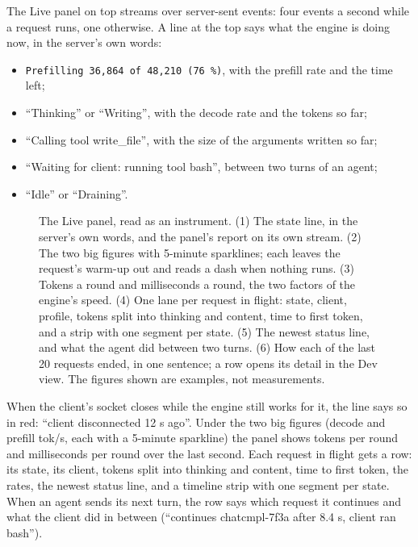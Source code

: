 The Live panel on top streams  over server-sent events: four events a second while a request runs, one otherwise. A line at the top says what the engine is doing now, in the server's own words:

\begin{itemize}
\item \texttt{Prefilling 36,864 of 48,210 (76\,\%)}, with the prefill rate and the time left;
\item \enquote{Thinking} or \enquote{Writing}, with the decode rate and the tokens so far;
\item \enquote{Calling tool write\_file}, with the size of the arguments written so far;
\item \enquote{Waiting for client: running tool bash}, between two turns of an agent;
\item \enquote{Idle} or \enquote{Draining}.
\end{itemize}

\begin{figure}[htbp]
\centering

\caption[The Live panel as an instrument readout]{The Live panel, read as an instrument. (1) The state line, in the server's own words, and the panel's report on its own stream. (2) The two big figures with 5-minute sparklines; each leaves the request's warm-up out and reads a dash when nothing runs. (3) Tokens a round and milliseconds a round, the two factors of the engine's speed. (4) One lane per request in flight: state, client, profile, tokens split into thinking and content, time to first token, and a strip with one segment per state. (5) The newest status line, and what the agent did between two turns. (6) How each of the last 20 requests ended, in one sentence; a row opens its detail in the Dev view. The figures shown are examples, not measurements.}\label{fig:live-panel}
\end{figure}

When the client's socket closes while the engine still works for it, the line says so in red: \enquote{client disconnected 12 s ago}. Under the two big figures (decode and prefill tok/s, each with a 5-minute sparkline) the panel shows tokens per round and milliseconds per round over the last second. Each request in flight gets a row: its state, its client, tokens split into thinking and content, time to first token, the rates, the newest status line, and a timeline strip with one segment per state. When an agent sends its next turn, the row says which request it continues and what the client did in between (\enquote{continues chatcmpl-7f3a after 8.4 s, client ran bash}).

